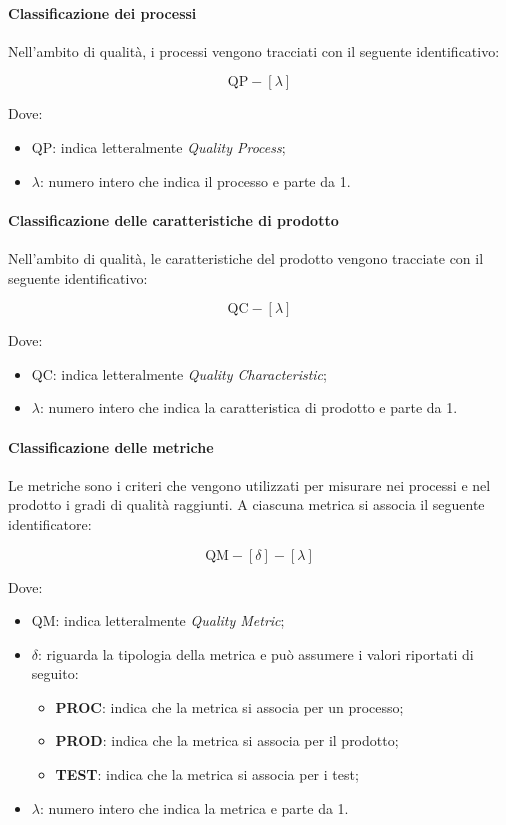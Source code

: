		\paragraph{Classificazione dei processi}

		Nell'ambito di qualità, i processi vengono tracciati con il seguente identificativo:

		\[
				\text{QP}-[\lambda]
		\]

		Dove:

		\begin{itemize}
			\item QP: indica letteralmente \textit{Quality Process};
			\item \(\lambda\): numero intero che indica il processo e parte da 1.
		\end{itemize}

		\paragraph{Classificazione delle caratteristiche di prodotto}

		Nell'ambito di qualità, le caratteristiche del prodotto vengono tracciate con il seguente identificativo:

		\[
				\text{QC}-[\lambda]
		\]

		Dove:

		\begin{itemize}
			\item QC: indica letteralmente \textit{Quality Characteristic};
			\item \(\lambda\): numero intero che indica la caratteristica di prodotto e parte da 1.
		\end{itemize}

		\paragraph{Classificazione delle metriche}

		Le metriche sono i criteri che vengono utilizzati per misurare nei processi e nel prodotto i gradi di qualità raggiunti. A ciascuna metrica si associa il seguente identificatore:

		\[
				\text{QM}-[\delta]-[\lambda]
		\]

		Dove:

		\begin{itemize}
			\item QM: indica letteralmente \textit{Quality Metric};
			\item \(\delta\): riguarda la tipologia della metrica e può assumere i valori riportati di seguito:
				\begin{itemize}
					\item \textbf{PROC}: indica che la metrica si associa per un processo;
					\item \textbf{PROD}: indica che la metrica si associa per il prodotto;
					\item \textbf{TEST}: indica che la metrica si associa per i test;
				\end{itemize}
			\item \(\lambda\): numero intero che indica la metrica e parte da 1.
		\end{itemize}


